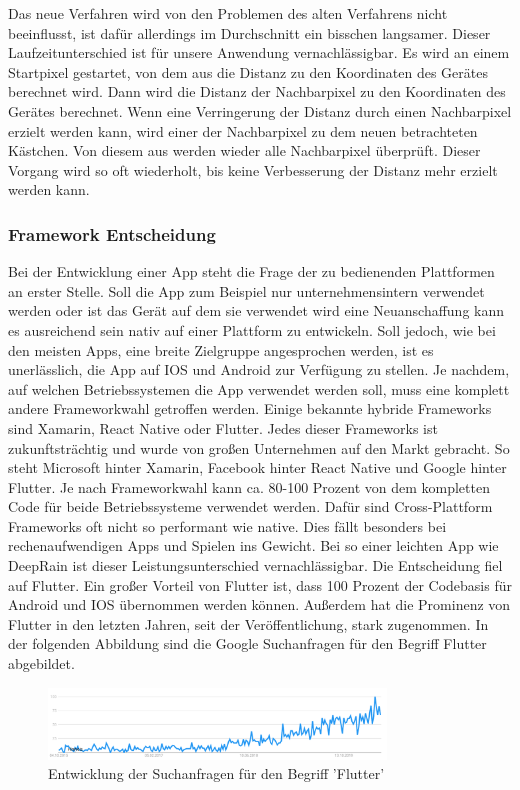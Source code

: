  \noindent 
 Das neue Verfahren wird von den Problemen des alten Verfahrens nicht beeinflusst, ist dafür allerdings im Durchschnitt ein bisschen langsamer. 
 Dieser Laufzeitunterschied ist für unsere Anwendung vernachlässigbar. 
 Es wird an einem Startpixel gestartet, von dem aus die Distanz zu den Koordinaten des Gerätes berechnet wird. 
 Dann wird die Distanz der Nachbarpixel zu den Koordinaten des Gerätes berechnet. 
 Wenn eine Verringerung der Distanz durch einen Nachbarpixel erzielt werden kann, wird einer der Nachbarpixel zu dem neuen betrachteten Kästchen. 
 Von diesem aus werden wieder alle Nachbarpixel überprüft. 
 Dieser Vorgang wird so oft wiederholt, bis keine Verbesserung der Distanz mehr erzielt werden kann.

\subsubsection{Framework Entscheidung}\label{framework entscheidung}
Bei der Entwicklung einer App steht die Frage der zu bedienenden Plattformen an erster Stelle. Soll die App zum Beispiel nur unternehmensintern verwendet 
werden oder ist das Gerät auf dem sie verwendet wird eine Neuanschaffung kann es ausreichend sein nativ auf einer Plattform zu entwickeln. Soll jedoch, 
wie bei den meisten Apps, eine breite Zielgruppe angesprochen werden, ist es unerlässlich, die App auf IOS und Android zur Verfügung zu stellen. 
Je nachdem, auf welchen Betriebssystemen die App verwendet werden soll, muss eine komplett andere Frameworkwahl getroffen werden. 
Einige bekannte hybride Frameworks sind Xamarin, React Native oder Flutter. Jedes dieser Frameworks ist zukunftsträchtig und wurde von großen 
Unternehmen auf den Markt gebracht. So steht Microsoft hinter Xamarin, Facebook hinter React Native und Google hinter Flutter. 
Je nach Frameworkwahl kann ca. 80-100 Prozent von dem kompletten Code für beide Betriebssysteme verwendet werden. 
Dafür sind Cross-Plattform Frameworks oft nicht so performant wie native. Dies fällt besonders bei rechenaufwendigen Apps und Spielen ins Gewicht. 
Bei so einer leichten App wie DeepRain ist dieser Leistungsunterschied vernachlässigbar.
Die Entscheidung fiel auf Flutter.
Ein großer Vorteil von Flutter ist, dass 100 Prozent der Codebasis für Android und IOS übernommen werden können. Außerdem hat die Prominenz von 
Flutter in den letzten Jahren, seit der Veröffentlichung, stark zugenommen. In der folgenden Abbildung sind die Google Suchanfragen für den Begriff 
Flutter abgebildet. 
\begin{figure}[H]
 \centering
 \includegraphics[width=0.8\textwidth,angle=0]{abb/flutter_google_trends}
 \caption[Entwicklung von Flutter]{Entwicklung der Suchanfragen für den Begriff 'Flutter'\cite{GoogleTrends}}
\label{fig:flutter_google_trends}
\end{figure}

